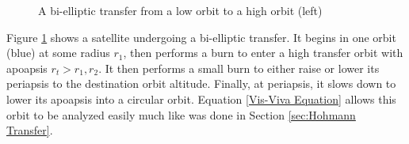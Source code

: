 \documentclass[../basicOrbitalDynamics.tex]{subfiles}
\begin{document}
\begin{figure}[H]
    \centering
    \def\Rone{0.75}
    \def\Rtwo{1.25}
    \def\trAP{4}
    \def\trSMAa{\fpeval{0.5*(\Rone+\trAP)}}
    \def\trSMAb{\fpeval{0.5*(\Rtwo+\trAP)}}
    \def\trEa{\fpeval{(\trAP/\trSMAa) - 1}}
    \def\trEb{\fpeval{(\trAP/\trSMAb) - 1}}
    \def\ctrXa{\fpeval{\Rone-\trSMAa}}
    \def\ctrXb{\fpeval{\Rtwo-\trSMAb}}
    \def\trSmAa{\fpeval{\trSMAa*sqrt(1-(\trEa)^2)}}
    \def\trSmAb{\fpeval{\trSMAb*sqrt(1-(\trEb)^2)}}
    \def\dV{1.25}
    \caption{A bi-elliptic transfer from a low orbit to a high orbit (left)}\label{fig:Bielliptic Transfer}
\end{figure}

Figure  \ref{fig:Bielliptic Transfer} shows a satellite undergoing a bi-elliptic transfer. It begins in one orbit (blue) at some radius $r_1$, then performs a burn to enter a high transfer orbit with apoapsis $r_t>r_1,r_2$. It then performs a small burn to either raise or lower its periapsis to the destination orbit altitude. Finally, at periapsis, it slows down to lower its apoapsis into a circular orbit. Equation  \eqref{Vis-Viva Equation} allows this orbit to be analyzed easily much like was done in Section  \ref{sec:Hohmann Transfer}.
\end{document}
